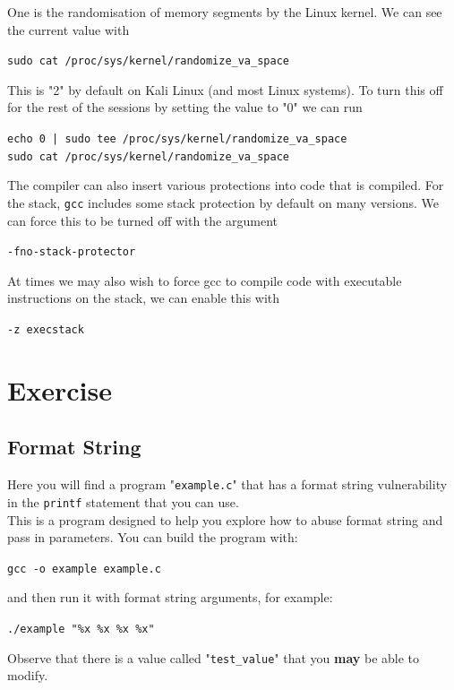 \documentclass{article}
\begin{document}
\noindent One is the randomisation of memory segments by the Linux kernel. We
can see the current value with
\begin{center}
    \lstinline{sudo cat /proc/sys/kernel/randomize_va_space}
\end{center}
\noindent This is "2" by default on Kali Linux (and most Linux systems). To turn this off for the rest of the sessions by setting the value to "0" we can run
\begin{center}
    \lstinline{echo 0 | sudo tee /proc/sys/kernel/randomize_va_space}\\
    \lstinline{sudo cat /proc/sys/kernel/randomize_va_space}
\end{center}
\noindent The compiler can also insert various protections into code that is compiled.
For the stack, \lstinline{gcc} includes some stack protection by default on many
versions. We can force this to be turned off with the argument
\begin{center}
    \lstinline{-fno-stack-protector}
\end{center}
\noindent At times we may also wish to force gcc to compile code with executable
instructions on the stack, we can enable this with
\begin{center}
    \lstinline{-z execstack}
\end{center}

\section{Exercise}
\subsection{Format String}
Here you will find a program "\lstinline{example.c}" that has a format string vulnerability in the \lstinline{printf} statement that you can use.\\

\noindent This is a program designed to help you explore how to abuse format string
and pass in parameters. You can build the program with:
\begin{center}
    \lstinline{gcc -o example example.c}
\end{center}
\noindent and then run it with format string arguments, for example:
\begin{center}
    \lstinline{./example "%x %x %x %x"}
\end{center}
\noindent Observe that there is a value called "\lstinline{test_value}" that you \textbf{may} be able to modify.\\
\end{document}

